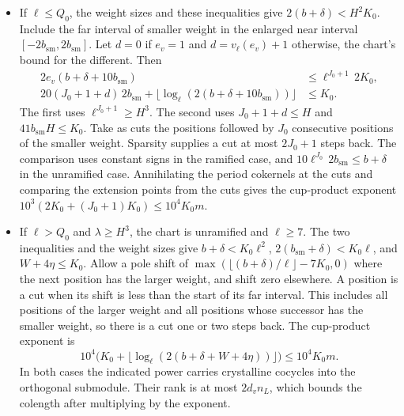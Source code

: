 \begin{itemize}
\item If \(\ell\le Q_0\), the weight sizes and these inequalities give
\(2(b+\delta)<H^2K_0\). Include the far interval of smaller weight in the enlarged
near interval \([-2b_{\mathrm{sm}},2b_{\mathrm{sm}}]\).
Let \(d=0\) if \(e_v=1\) and \(d=v_\ell(e_v)+1\) otherwise, the chart's bound for the different.
Then
\[
 \begin{split}
 2e_v(b+\delta+10b_{\mathrm{sm}})&\le
      \ell^{J_0+1}\,2K_0,\\
 20(J_0+1+d)\,2b_{\mathrm{sm}}+
       \lfloor\log_\ell(2(b+\delta+10b_{\mathrm{sm}}))\rfloor&\le K_0 .
 \end{split}
\]
The first uses \(\ell^{J_0+1}\ge H^3\). The second uses \(J_0+1+d\le H\) and
\(41 b_{\mathrm{sm}}H\le K_0\). Take as cuts the positions followed by \(J_0\)
consecutive positions of the smaller weight. Sparsity supplies a cut at most \(2J_0+1\)
steps back. The comparison uses constant signs in the ramified case, and
\(10\ell^{J_0}\,2b_{\mathrm{sm}}\le b+\delta\) in the unramified case.
Annihilating the period cokernels at the cuts and comparing the extension points
from the cuts gives the cup-product exponent \(10^3(2K_0+(J_0+1)K_0)\le10^4K_0m\).

\item If \(\ell>Q_0\) and \(\lambda\ge H^3\), the chart is unramified and \(\ell\ge7\).
The two inequalities and the weight sizes give \(b+\delta<K_0\ell^2\),
\(2(b_{\mathrm{sm}}+\delta)<K_0\ell\), and \(W+4\eta\le K_0\).
Allow a pole shift of \(\max(\lfloor(b+\delta)/\ell\rfloor-7K_0,0)\) where the next position
has the larger weight, and shift zero elsewhere. A position is a cut when its shift is less
than the start of its far interval. This includes all positions of the larger weight and
all positions whose successor has the smaller weight, so there is a cut one or two steps back.
The cup-product exponent is
\[
 10^4\bigl(K_0+\lfloor\log_\ell(2(b+\delta+W+4\eta))\rfloor\bigr)
 \le10^4K_0m.
\]
In both cases the indicated power carries crystalline cocycles into the orthogonal
submodule. Their rank is at most \(2d_v n_L\), which bounds the colength after multiplying
by the exponent.


\end{itemize}
